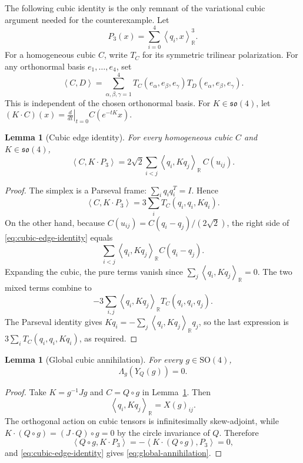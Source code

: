 \documentclass[11pt,reqno]{amsart}
\newtheorem{lemma}[theorem]{Lemma}
\theoremstyle{remark}
\newcommand{\R}{\mathbb R}
\newcommand{\SO}{\mathrm{SO}}
\newcommand{\ip}[2]{\left\langle #1,#2\right\rangle}
\begin{document}
The following cubic identity is the only remnant of the variational cubic
argument needed for the counterexample.  Let
\[
 P_3(x)=\sum_{i=0}^4\ip{q_i}{x}_{\R}^3.
\]
For a homogeneous cubic $C$, write $T_C$ for its symmetric trilinear
polarization.  For any orthonormal basis $e_1,\dots,e_4$, set
\[
 \ip{C}{D}=\sum_{\alpha,\beta,\gamma=1}^4
 T_C(e_\alpha,e_\beta,e_\gamma)
 T_D(e_\alpha,e_\beta,e_\gamma).
\]
This is independent of the chosen orthonormal basis.  For
$K\in\mathfrak{so}(4)$, let
$(K\cdot C)(x)=\left.\frac{d}{dt}\right|_{t=0}C(e^{-tK}x)$.

\begin{lemma}[Cubic edge identity]\label{lem:cubic-edge-identity}
For every homogeneous cubic $C$ and $K\in\mathfrak{so}(4)$,
\begin{equation}\label{eq:cubic-edge-identity}
 \ip{C}{K\cdot P_3}
 =2\sqrt2\sum_{i<j}\ip{q_i}{Kq_j}_{\R}\,C(u_{ij}).
\end{equation}
\end{lemma}

\begin{proof}
The simplex is a Parseval frame: $\sum_iq_iq_i^T=I$.  Hence
\[
 \ip{C}{K\cdot P_3}
 =3\sum_iT_C(q_i,q_i,Kq_i).
\]
On the other hand, because $C(u_{ij})=C(q_i-q_j)/(2\sqrt2)$, the right side
of \eqref{eq:cubic-edge-identity} equals
\[
 \sum_{i<j}\ip{q_i}{Kq_j}_{\R}C(q_i-q_j).
\]
Expanding the cubic, the pure terms vanish since
$\sum_j\ip{q_i}{Kq_j}_{\R}=0$.  The two mixed terms combine to
\[
 -3\sum_{i,j}\ip{q_i}{Kq_j}_{\R}T_C(q_i,q_i,q_j).
\]
The Parseval identity gives
$Kq_i=-\sum_j\ip{q_i}{Kq_j}_{\R}q_j$, so the last expression is
$3\sum_iT_C(q_i,q_i,Kq_i)$, as required.
\end{proof}

\begin{lemma}[Global cubic annihilation]\label{lem:global-annihilation}
For every $g\in\SO(4)$,
\begin{equation}\label{eq:global-annihilation}
 \Lambda_g(Y_Q(g))=0.
\end{equation}
\end{lemma}

\begin{proof}
Take $K=g^{-1}Jg$ and $C=Q\circ g$ in
Lemma~\ref{lem:cubic-edge-identity}.  Then
\[
 \ip{q_i}{Kq_j}_{\R}=X(g)_{ij}.
\]
The orthogonal action on cubic tensors is infinitesimally skew-adjoint, while
$K\cdot(Q\circ g)=(J\cdot Q)\circ g=0$ by the circle invariance of $Q$.
Therefore
\[
 \ip{Q\circ g}{K\cdot P_3}
 =-\ip{K\cdot(Q\circ g)}{P_3}=0,
\]
and \eqref{eq:cubic-edge-identity} gives \eqref{eq:global-annihilation}.
\end{proof}
\end{document}
